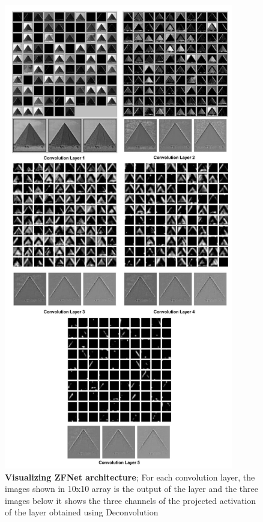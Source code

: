 \documentclass{article} %
\begin{document}
	\newpage
	\begin{figure}[!htb]
		\centering
		\includegraphics[width=10cm]{Images/ZFNet_Viz}
		\caption{\textbf{Visualizing ZFNet architecture}; For each convolution layer, the images shown in 10x10 array is the output of the layer and the three images below it shows the three channels of the projected activation of the layer obtained using Deconvolution}
	\end{figure}

	\newpage
\end{document}
